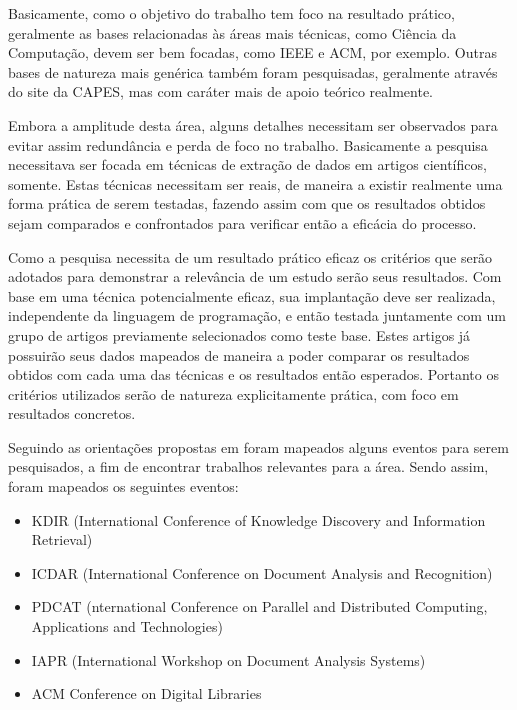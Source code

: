 \documentclass[
	12pt,               %
	openright,          %
	twoside,            %
	a4paper,            %
	english,            %
	brazil              %
	]{abntex2}
\begin{document}

Basicamente, como o objetivo do trabalho tem foco na resultado prático, geralmente as bases relacionadas às áreas mais técnicas, como Ciência da Computação, devem ser bem focadas, como IEEE e ACM, por exemplo. Outras bases de natureza mais genérica também foram pesquisadas, geralmente através do site da CAPES, mas com caráter mais de apoio teórico realmente.

Embora a amplitude desta área, alguns detalhes necessitam ser observados para evitar assim redundância e perda de foco no trabalho. Basicamente a pesquisa necessitava ser focada em técnicas de extração de dados em artigos científicos, somente. Estas técnicas necessitam ser reais, de maneira a existir realmente uma forma prática de serem testadas, fazendo assim com que os resultados obtidos sejam comparados e confrontados para verificar então a eficácia do processo.

Como a pesquisa necessita de um resultado prático eficaz os critérios que serão adotados para demonstrar a relevância de um estudo serão seus resultados. Com base em uma técnica potencialmente eficaz, sua implantação deve ser realizada, independente da linguagem de programação, e então testada juntamente com um grupo de artigos previamente selecionados como teste base. Estes artigos já possuirão seus dados mapeados de maneira a poder comparar os resultados obtidos com cada uma das técnicas e os resultados então esperados. Portanto os critérios utilizados serão de natureza explicitamente prática, com foco em resultados concretos.


Seguindo as orientações propostas em \cite{rsl-manual} foram mapeados alguns eventos para serem pesquisados, a fim de encontrar trabalhos relevantes para a área. Sendo assim, foram mapeados os seguintes eventos:

\begin{itemize}
\item KDIR (International Conference of Knowledge Discovery and Information Retrieval)
\item ICDAR (International Conference on Document Analysis and Recognition)
\item PDCAT (nternational Conference on Parallel and Distributed Computing, Applications and Technologies)
\item IAPR (International Workshop on Document Analysis Systems)
\item ACM Conference on Digital Libraries
\end{itemize}
\end{document}

